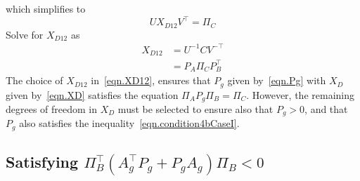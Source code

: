 which simplifies to
\begin{equation*}
  U
  X_{D12}
  V^{\top}
  = \Pi_{C}
\end{equation*}
Solve for $X_{D12}$ as
\begin{equation}
  \label{eqn.XD12}
  \begin{split}
    X_{D12}
    &= U^{-1}CV^{-\top} \\
    &= P_{A}\Pi_{C}P_{B}^{\top}
  \end{split}
\end{equation}
The choice of $X_{D12}$ in\ \eqref{eqn.XD12}, ensures that $P_{g}$ given by\ \eqref{eqn.Pg} with $X_{D}$ given by\ \eqref{eqn.XD} satisfies the equation $\Pi_{A}P_{g}\Pi_{B}=\Pi_{C}$.
However, the remaining degrees of freedom in $X_{D}$ must be selected to ensure also that $P_{g}>0$, and that $P_{g}$ also satisfies the inequality\ \eqref{eqn.condition4bCaseI}.

\subsection{Satisfying $\Pi_{B}^{\top} (A_{g}^{\top}P_{g} + P_{g}A_{g}) \Pi_{B} < 0$}

